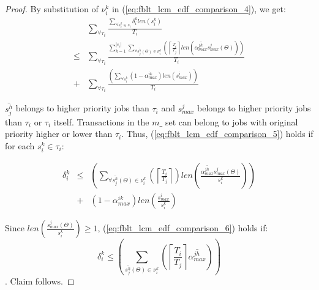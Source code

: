 \documentclass[conference]{IEEEtran}
\begin{document}
\begin{proof}
 By substitution of $\nu_{i}^{k}$ in
(\ref{eq:fblt_lcm_edf_comparison_4}), we get:  
\begin{eqnarray}
 & \sum_{\forall\tau_{i}}\frac{\sum_{\forall s_{i}^{k}\in s_{i}}\delta_i^klen(s_{i}^{k})}{T_{i}}\label{eq:fblt_lcm_edf_comparison_5}\\
\le & \sum_{\forall\tau_{i}}\frac{\sum_{k=1}^{|s_{i}|}\sum_{\forall\bar{s_{j}^{h}}(\Theta)\in\nu_{i}^{k}}\left(\left\lceil \frac{T_{i}}{T_{j}}\right\rceil len\left(\bar{\alpha_{max}^{jh}}s_{max}^{j}(\Theta)\right)\right)}{T_{i}}\nonumber \\
+ & \sum_{\forall\tau_{i}}\frac{\left(\sum_{\forall s_{i}^{k}}\left(1-\alpha_{max}^{ik}\right)len\left(s_{max}^{i}\right)\right)}{T_{i}}\nonumber 
\end{eqnarray}

$\bar{s_{j}^{h}}$ belongs to higher priority jobs than $\tau_{i}$
and $s_{max}^{j}$ belongs to higher priority jobs than $\tau_{i}$
or $\tau_{i}$ itself. Transactions in the $m\_$ set can belong to jobs
with original priority higher or lower than $\tau_{i}$. Thus, (\ref{eq:fblt_lcm_edf_comparison_5})
holds if for each $s_{i}^{k}\in\tau_{i}$:
\begin{comment} 
\[
\delta_i^klen(s_{i}^{k})\le\left(\sum_{\forall\bar{s_{j}^{h}}(\Theta)\in\nu_{i}^{k}}\left(\left\lceil \frac{T_{i}}{T_{j}}\right\rceil \right)len\left(\bar{\alpha_{max}^{jh}}s_{max}^{j}(\Theta)\right)\right)+\left(1-\alpha_{max}^{ik}\right)len\left(s_{max}^{i}\right)
\]

This leads to:

\begin{equation}
\delta_i^k\le\left(\sum_{\forall\bar{s_{j}^{h}}(\Theta)\in\nu_{i}^{k}}\left(\left\lceil \frac{T_{i}}{T_{j}}\right\rceil \right)len\left(\frac{\bar{\alpha_{max}^{jh}}s_{max}^{j}(\Theta)}{s_{i}^{k}}\right)\right)+\left(1-\alpha_{max}^{ik}\right)len\left(\frac{s_{max}^{i}}{s_{i}^{k}}\right)\label{eq:fblt_lcm_edf_comparison_6}
\end{equation}
\end{comment}

\begin{eqnarray}
\delta_i^k & \le & \left(\sum_{\forall\bar{s_{j}^{h}}(\Theta)\in\nu_{i}^{k}}\left(\left\lceil \frac{T_{i}}{T_{j}}\right\rceil \right)len\left(\frac{\bar{\alpha_{max}^{jh}}s_{max}^{j}(\Theta)}{s_{i}^{k}}\right)\right)\nonumber\\
& + & \left(1-\alpha_{max}^{ik}\right)len\left(\frac{s_{max}^{i}}{s_{i}^{k}}\right)\label{eq:fblt_lcm_edf_comparison_6}
\end{eqnarray}

Since $len\left(\frac{s_{max}^{j}(\Theta)}{s_{i}^{k}}\right)\ge1$, (\ref{eq:fblt_lcm_edf_comparison_6}) holds if: 
\begin{equation*}
\delta_i^k\le\left(\sum_{\bar{s_{j}^{h}}(\Theta)\in\nu_{i}^{k}}\left(\left\lceil \frac{T_{i}}{T_{j}}\right\rceil \bar{\alpha_{max}^{jh}}\right)\right)
\end{equation*}. Claim follows.

\end{proof}
\end{document}

